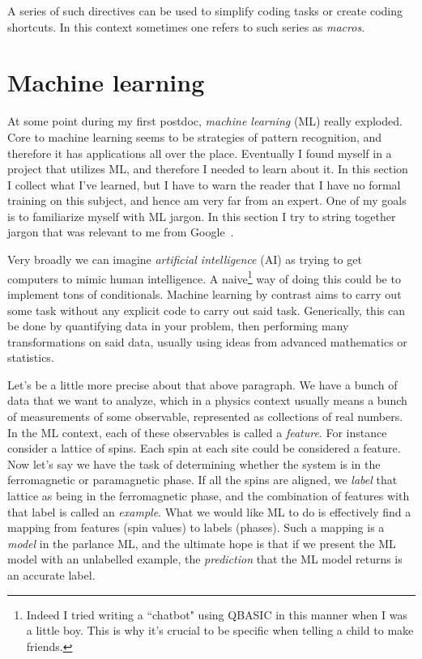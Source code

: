 A series of such directives can be used to simplify coding tasks or create
coding shortcuts. In this context sometimes one refers to such series as {\it
macros}.

\section{Machine learning}\label{sec:ML}

At some point during my first postdoc, {\it machine learning} (ML) really exploded.
Core to machine learning seems to be strategies of pattern recognition, and
therefore it has applications all over the place. Eventually I found myself in a
project that utilizes ML, and therefore I needed to learn about it. In this
section I collect what I've learned, but I have to warn the reader that
I have no formal training on this subject, and hence am very far from an expert.
One of my goals is to familiarize myself with ML jargon. In this section I
try to string together jargon that was relevant to me from
Google~\cite{google_ML}.

Very broadly we can imagine {\it artificial intelligence} (AI) as trying to get computers to mimic human intelligence. 
A naive\footnote{Indeed I tried writing a ``chatbot" using QBASIC in this
manner when I was a little boy. This is why it's crucial to be specific
when telling a child to make friends.} way of doing this could be to implement tons 
of conditionals. Machine learning by contrast aims to carry out some
task without any explicit code to carry out said task. Generically,
this can be done by quantifying data in your problem, then performing many
transformations on said data, usually using ideas from advanced mathematics
or statistics.

Let's be a little more precise about that above paragraph.
We have a bunch of data that we want to analyze, which in a physics context
usually means a bunch of measurements of some observable,
represented as collections of real numbers. In the ML context, each of
these observables is called a {\it feature}. For instance
consider a lattice of spins. Each spin at each site could be considered
a feature. Now let's say we have the task of determining
whether the system is in the ferromagnetic or paramagnetic phase.
If all the spins are aligned, we {\it label} that lattice
as being in the ferromagnetic phase, and the combination of features
with that label is called an {\it example}.
What we would like ML to do
is effectively find a mapping from features (spin values) to labels (phases). 
Such a mapping is a {\it model} in the parlance ML, and
the ultimate hope is that if we present the ML model with an unlabelled
example, the {\it prediction} 
that the ML model returns is an accurate label.

